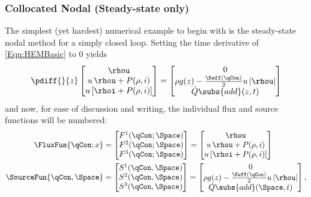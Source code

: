 \subsubsection{Collocated Nodal (Steady-state only)}\label{Subsubsection:CollocatedNodal}
The simplest (yet hardest) numerical example to begin with is the steady-state nodal method for a simply closed loop.
Setting the time derivative of \cref{Eqn:HEMBasic} to $0$ yields 
\begin{equation}
    \pdiff{}{z}\begin{bmatrix}
                    \rhou                 \\
                    u\,\rhou + P(\rho,i)   \\
                    u\left[\rhoi  + P(\rho,i)\right]
                \end{bmatrix}
             =  
    \begin{bmatrix}
        0 \\%
        \rho{g(z)} - \frac{\Keff(\qCon)}{2} u\,|\rhou|  \\
        \dot{Q}\subs{add}(z,t)
    \end{bmatrix}
    \label{Eqn:HEMBasicSS}
\end{equation}
and now, for ease of discussion and writing, the individual flux and source functions will be numbered:
\begin{align}
    \FluxFun{\qCon;x} &=    
                \begin{bmatrix}
                    F^1(\qCon;\Space)\\
                    F^2(\qCon;\Space)\\
                    F^3(\qCon;\Space)\\
                \end{bmatrix}
           =    \begin{bmatrix}
                    \rhou                 \\
                    u\,\rhou + P(\rho,i)   \\
                    u\left[\rhoi  + P(\rho,i)\right]
                \end{bmatrix} \\
    \SourceFun{\qCon,\Space} &=  
            \begin{bmatrix}
                    S^1(\qCon,\Space)\\
                    S^2(\qCon,\Space)\\
                    S^3(\qCon,\Space)\\
                \end{bmatrix}
             =  \begin{bmatrix}
                    0 \\%
                    \rho{g(z)} - \frac{\Keff(\qCon)}{2} u\,|\rhou|  \\
                    \dot{Q}\subs{add}(\Space,t)
                \end{bmatrix},
\end{align}

